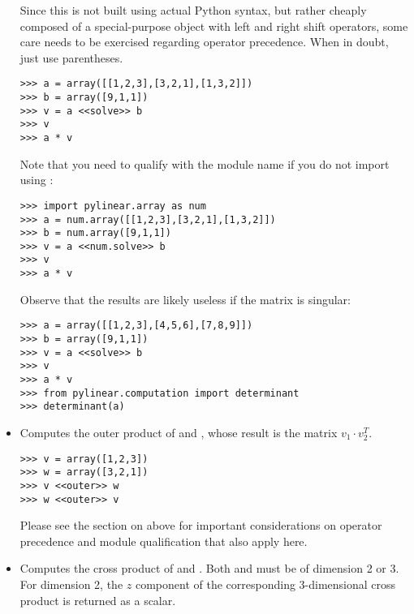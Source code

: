 \begin{itemize}
  Since this is not built using actual Python syntax, but rather cheaply
  composed of a special-purpose  object with left and right
  shift operators, some care needs to be exercised regarding operator
  precedence. When in doubt, just use parentheses.

\begin{verbatim}
>>> a = array([[1,2,3],[3,2,1],[1,3,2]])
>>> b = array([9,1,1])
>>> v = a <<solve>> b
>>> v
>>> a * v
\end{verbatim}

  Note that you need to qualify  with the module name if you
  do not import  using :

\begin{verbatim}
>>> import pylinear.array as num
>>> a = num.array([[1,2,3],[3,2,1],[1,3,2]])
>>> b = num.array([9,1,1])
>>> v = a <<num.solve>> b
>>> v
>>> a * v
\end{verbatim}

  Observe that the results are likely useless if the matrix
  is singular:

\begin{verbatim}
>>> a = array([[1,2,3],[4,5,6],[7,8,9]])
>>> b = array([9,1,1])
>>> v = a <<solve>> b
>>> v
>>> a * v
>>> from pylinear.computation import determinant
>>> determinant(a)
\end{verbatim}

\item {}
  
  Computes the outer product of  and ,
  whose result is the matrix $v_1 \cdot v_2^T$.

\begin{verbatim}
>>> v = array([1,2,3])
>>> w = array([3,2,1])
>>> v <<outer>> w
>>> w <<outer>> v
\end{verbatim}

  Please see the section on  above for important
  considerations on operator precedence and module qualification
  that also apply here.

\item {}
  
  Computes the cross product of  and .
  Both  and  must be of dimension 2 or 3.
  For dimension 2, the $z$ component of the corresponding 3-dimensional
  cross product is returned as a scalar. 


\end{itemize}
